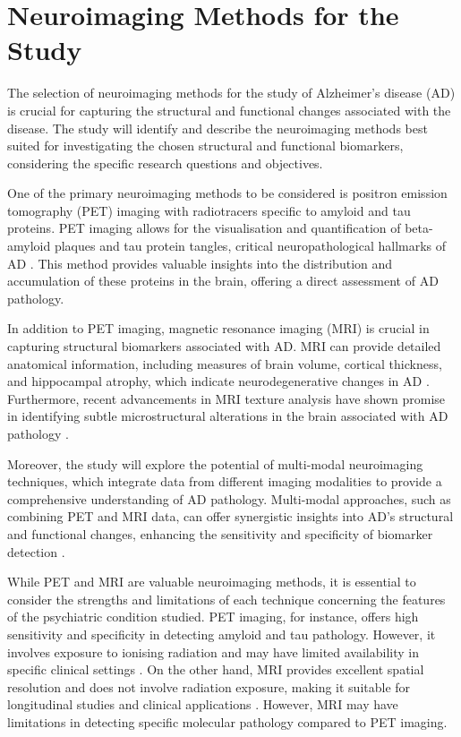 \documentclass[10pt]{article}
\begin{document}
\begin{sloppypar}
  \section{Neuroimaging Methods for the Study}
  \label{sec:neuroimaging-methods}

  The selection of neuroimaging methods for the study of Alzheimer's disease (AD) is crucial for capturing the structural and functional changes associated with the disease. The study will identify and describe the neuroimaging methods best suited for investigating the chosen structural and functional biomarkers, considering the specific research questions and objectives.

  One of the primary neuroimaging methods to be considered is positron emission tomography (PET) imaging with radiotracers specific to amyloid and tau proteins. PET imaging allows for the visualisation and quantification of beta-amyloid plaques and tau protein tangles, critical neuropathological hallmarks of AD \citep{jack_serial_2009}. This method provides valuable insights into the distribution and accumulation of these proteins in the brain, offering a direct assessment of AD pathology.

  In addition to PET imaging, magnetic resonance imaging (MRI) is crucial in capturing structural biomarkers associated with AD. MRI can provide detailed anatomical information, including measures of brain volume, cortical thickness, and hippocampal atrophy, which indicate neurodegenerative changes in AD \citep{cai_magnetic_2020}. Furthermore, recent advancements in MRI texture analysis have shown promise in identifying subtle microstructural alterations in the brain associated with AD pathology \citep{cai_magnetic_2020}.

  Moreover, the study will explore the potential of multi-modal neuroimaging techniques, which integrate data from different imaging modalities to provide a comprehensive understanding of AD pathology. Multi-modal approaches, such as combining PET and MRI data, can offer synergistic insights into AD's structural and functional changes, enhancing the sensitivity and specificity of biomarker detection \citep{ran_multimodal_2022}.

  While PET and MRI are valuable neuroimaging methods, it is essential to consider the strengths and limitations of each technique concerning the features of the psychiatric condition studied. PET imaging, for instance, offers high sensitivity and specificity in detecting amyloid and tau pathology. However, it involves exposure to ionising radiation and may have limited availability in specific clinical settings \citep{bao_pet_2021}. On the other hand, MRI provides excellent spatial resolution and does not involve radiation exposure, making it suitable for longitudinal studies and clinical applications \citep{cai_magnetic_2020}. However, MRI may have limitations in detecting specific molecular pathology compared to PET imaging.


\end{sloppypar}
\end{document}
